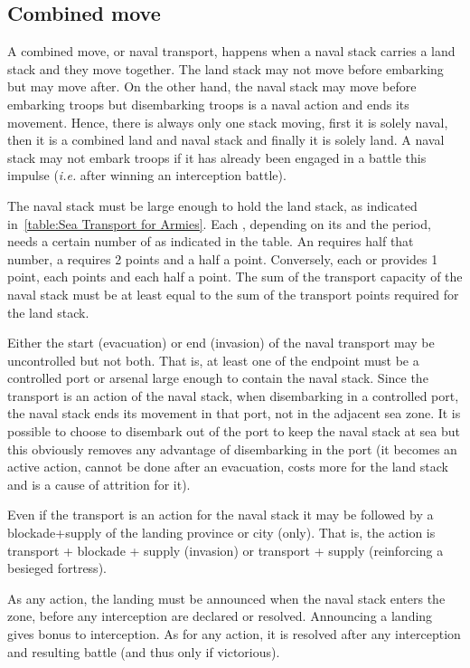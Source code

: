 \subsection{Combined move}
A combined move, or naval transport, happens when a naval stack carries a land
stack and they move together. The land stack may not move before embarking but
may move after. On the other hand, the naval stack may move before embarking
troops but disembarking troops is a naval action and ends its movement. Hence,
there is always only one stack moving, first it is solely naval, then it is a
combined land and naval stack and finally it is solely land. A naval stack may
not embark troops if it has already been engaged in a battle this impulse
(\emph{i.e.} after winning an interception battle).

The naval stack must be large enough to hold the land stack, as indicated
in~\ref{table:Sea Transport for Armies}. Each \ARMY\Faceplus, depending on its
 and the period, needs a certain number of  as indicated in the table. An \ARMY\Facemoins requires half that
number, a \LD requires 2 points and a \LDE half a point. Conversely, each \NWD
or \NGD provides 1 point, each  points and each \NDE half a point. The
sum of the transport capacity of the naval stack must be at least equal to the
sum of the transport points required for the land stack.


Either the start (evacuation) or end (invasion) of the naval transport may be
uncontrolled but not both. That is, at least one of the endpoint must be a
controlled port or arsenal large enough to contain the naval stack. Since the
transport is an action of the naval stack, when disembarking in a controlled
port, the naval stack ends its movement in that port, not in the adjacent sea
zone. It is possible to choose to disembark out of the port to keep the naval
stack at sea but this obviously removes any advantage of disembarking in the
port (it becomes an active action, cannot be done after an evacuation, costs
more \MP for the land stack and is a cause of attrition for it).

Even if the transport is an action for the naval stack it may be followed by a
blockade+supply of the landing province or city (only). That is, the action is
transport + blockade + supply (invasion) or transport + supply (reinforcing a
besieged fortress).

As any action, the landing must be announced when the naval stack enters the
zone, before any interception are declared or resolved. Announcing a landing
gives bonus to interception. As for any action, it is resolved after any
interception and resulting battle (and thus only if victorious).

